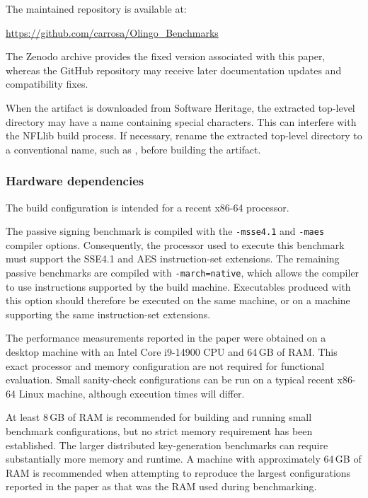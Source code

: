 \documentclass[nonacm,sigconf]{acmart}
\begin{document}
The maintained repository is available at:
\begin{center}
  \url{https://github.com/carrosa/Olingo_Benchmarks}
\end{center}

The Zenodo archive provides the fixed version associated with this paper, whereas the GitHub repository may receive later documentation updates and compatibility fixes.

When the artifact is downloaded from Software Heritage, the extracted top-level directory may have a name containing special characters. This can interfere with the NFLlib build process. If necessary, rename the extracted top-level directory to a conventional name, such as , before building the artifact.


\subsubsection{Hardware dependencies}



The build configuration is intended for a recent x86-64 processor.

The passive signing benchmark is compiled with the \texttt{-msse4.1} and \texttt{-maes} compiler options. Consequently, the processor used to execute this benchmark must support the SSE4.1 and AES instruction-set extensions. The remaining passive benchmarks are compiled with \texttt{-march=native}, which allows the compiler to use instructions supported by the build machine. Executables produced with this option should therefore be executed on the same machine, or on a machine supporting the same instruction-set extensions.

The performance measurements reported in the paper were obtained on a desktop machine with an Intel Core i9-14900 CPU and 64\,GB of RAM. This exact processor and memory configuration are not required for functional evaluation. Small sanity-check configurations can be run on a typical recent x86-64 Linux machine, although execution times will differ.

At least 8\,GB of RAM is recommended for building and running small benchmark configurations, but no strict memory requirement has been established. The larger distributed key-generation benchmarks can require substantially more memory and runtime. A machine with approximately 64\,GB of RAM is recommended when attempting to reproduce the largest configurations reported in the paper as that was the RAM used during benchmarking.
\end{document}
